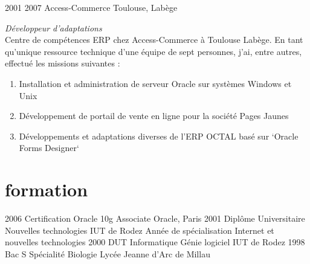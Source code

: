 \documentclass{friggeri-cv} 	%
\begin{document}
\begin{entrylist}
\entry
{2001  2007}
{Access-Commerce}
{Toulouse, Labège}
{\vspace{0.2cm}\emph{Développeur d'adaptations}  \\
Centre de compétences ERP chez Access-Commerce à Toulouse Labège.
En tant qu’unique ressource technique d'une équipe de sept personnes, j’ai, entre autres, effectué les
missions suivantes :
\begin{enumerate}
\item Installation et administration de serveur Oracle sur systèmes Windows et Unix
\item Développement de portail de vente en ligne pour la société Pages Jaunes
\item Développements et adaptations diverses de l'ERP OCTAL basé sur `Oracle Forms Designer`
\end{enumerate}
}
\end{entrylist}
\newpage


\section{formation}

\begin{entrylist}
\entry
{2006}
{Certification Oracle {\normalfont 10g Associate}}
{Oracle, Paris}
{}
\entry
{2001}
{Diplôme Universitaire {\normalfont Nouvelles technologies}}
{IUT de Rodez}
{Année de spécialisation Internet et nouvelles technologies}
\entry
{2000}
{DUT {\normalfont Informatique Génie logiciel}}
{IUT de Rodez}
{}
\entry
{1998}
{Bac S {\normalfont Spécialité Biologie}}
{Lycée Jeanne d'Arc de Millau}
{}
\end{entrylist}

\end{document}
